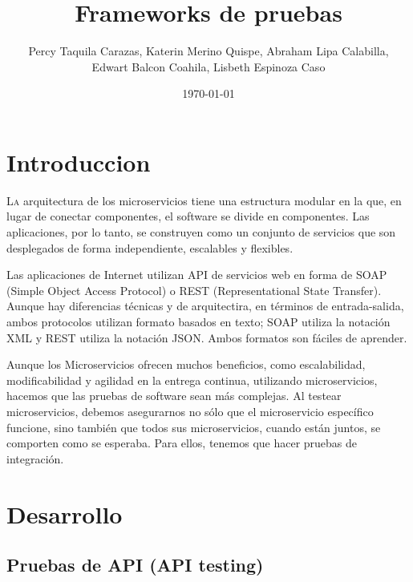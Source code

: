 \documentclass[twoside,twocolumn]{article}
\title{Frameworks de pruebas}
\author{Percy Taquila Carazas, Katerin Merino Quispe, Abraham Lipa Calabilla,
\\Edwart Balcon Coahila, Lisbeth Espinoza Caso}
\date{\today}
\begin{document}
\maketitle


\section{Introduccion}

\lettrine[nindent=0em,lines=3]{L}a arquitectura de los microservicios tiene una estructura modular en la que, en lugar de conectar componentes, el software se divide en componentes. Las aplicaciones, por lo tanto, se construyen como un conjunto de servicios que son desplegados de forma independiente, escalables y flexibles.

Las aplicaciones de Internet utilizan API de servicios web en forma de SOAP (Simple Object Access Protocol) o REST (Representational State Transfer). Aunque hay diferencias técnicas y de arquitectira, en términos de entrada-salida, ambos protocolos utilizan formato basados en texto; SOAP utiliza la notación XML y REST utiliza la notación JSON. Ambos formatos son fáciles de aprender.

Aunque los Microservicios ofrecen muchos beneficios, como escalabilidad, modificabilidad y agilidad en la entrega continua, utilizando microservicios, hacemos que las pruebas de software sean más complejas. Al testear microservicios, debemos asegurarnos no sólo que el microservicio específico funcione, sino también que todos sus microservicios, cuando están juntos, se comporten como se esperaba. Para ellos, tenemos que hacer pruebas de integración. 




\section{Desarrollo}

\subsection{Pruebas de API (API testing)}
\end{document}
